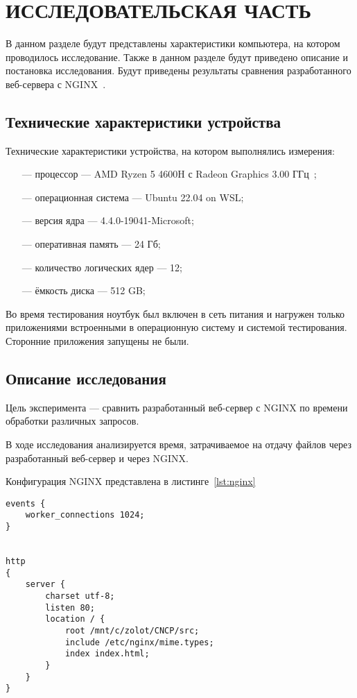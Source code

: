 \chapter{ИССЛЕДОВАТЕЛЬСКАЯ ЧАСТЬ}

В данном разделе будут представлены характеристики компьютера, на котором проводилось исследование. Также в данном разделе будут приведено описание и постановка исследования. Будут приведены результаты сравнения разработанного веб-сервера с NGINX~\cite{nginx}.

\section{Технические характеристики устройства}

Технические характеристики устройства, на котором выполнялись измерения:

\begin{itemize}
	\item[---] процессор --- AMD Ryzen 5 4600H с Radeon Graphics 3.00 ГГц~\cite{proc};
	\item[---] операционная система --- Ubuntu 22.04 on WSL;
	\item[---] версия ядра --- 4.4.0-19041-Microsoft;
	\item[---] оперативная память --- 24 Гб;
	\item[---] количество логических ядер --- 12;
	\item[---] ёмкость диска --- 512 GB;
\end{itemize}

Во время тестирования ноутбук был включен в сеть питания и нагружен только приложениями встроенными в операционную систему и системой тестирования. Сторонние приложения запущены не были.

\section{Описание исследования}

Цель эксперимента --- сравнить разработанный веб-сервер с NGINX по времени обработки различных запросов. 

В ходе исследования анализируется время, затрачиваемое на отдачу файлов через разработанный веб-сервер и через NGINX.

Конфигурация NGINX представлена в листинге~\ref{lst:nginx}

\begin{lstlisting}[label=lst:nginx, caption=Конфигурация nginx]
events {
	worker_connections 1024;
}


http
{
	server {
		charset utf-8;
		listen 80;
		location / {
			root /mnt/c/zolot/CNCP/src;
			include /etc/nginx/mime.types;
			index index.html;
		}
	}
}
\end{lstlisting}

